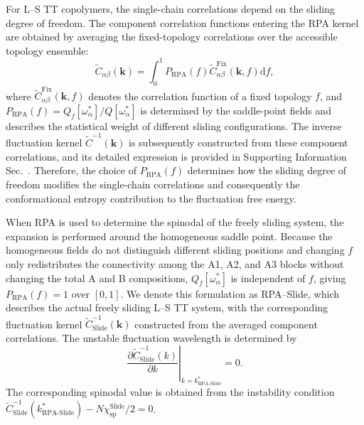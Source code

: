     For L--S TT copolymers, the single-chain correlations depend on the sliding degree of freedom.
    The component correlation functions entering the RPA kernel are obtained by averaging the fixed-topology correlations over the accessible topology ensemble:
    \begin{equation}
        \widetilde C_{\alpha\beta}(\bm k)
        =
        \int_0^1
        P_{\mathrm{RPA}}(f)
        \widetilde C_{\alpha\beta}^{\mathrm{Fix}}(\bm k,f)
        \mathrm df,
        \label{eq:RPACorrelation}
    \end{equation}
    where $\widetilde C_{\alpha\beta}^{\mathrm{Fix}}(\bm k,f)$ denotes the correlation function of a fixed topology $f$, and $P_{\mathrm{RPA}}(f)=Q_f[\omega_\alpha^\ast]/Q[\omega_\alpha^\ast]$ is determined by the saddle-point fields and describes the statistical weight of different sliding configurations.
    The inverse fluctuation kernel $\widetilde C^{-1}(\bm k)$ is subsequently constructed from these component correlations, and its detailed expression is provided in Supporting Information Sec.~.
    Therefore, the choice of $P_{\mathrm{RPA}}(f)$ determines how the sliding degree of freedom modifies the single-chain correlations and consequently the conformational entropy contribution to the fluctuation free energy.


    When RPA is used to determine the spinodal of the freely sliding system, the expansion is performed around the homogeneous saddle point.
    Because the homogeneous fields do not distinguish different sliding positions and changing $f$ only redistributes the connectivity among the A1, A2, and A3 blocks without changing the total A and B compositions, $Q_f[\omega_\alpha^\ast]$ is independent of $f$, giving $P_{\mathrm{RPA}}(f)=1$ over $[0,1]$.
    We denote this formulation as RPA--Slide, which describes the actual freely sliding L--S TT system, with the corresponding fluctuation kernel $\widetilde C_{\mathrm{Slide}}^{-1}(\bm k)$ constructed from the averaged component correlations.
    The unstable fluctuation wavelength is determined by
    \begin{equation}
        \left.
        \frac{\partial
        \widetilde C_{\mathrm{Slide}}^{-1}(k)}
        {\partial k}
        \right|_{k=k_{\mathrm{RPA\text{-}Slide}}^\ast}
        =
        0.
    \end{equation}
    The corresponding spinodal value is obtained from the instability condition $\widetilde C_{\mathrm{Slide}}^{-1}(k_{\mathrm{RPA\text{-}Slide}}^\ast)-N\chi^{\text{Slide}}_{\mathrm{sp}}/2=0$.


